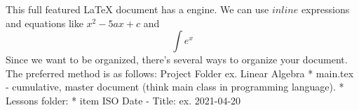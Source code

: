 \markdownRendererUlBegin
\markdownRendererUlItem This full featured LaTeX document has a  engine.\markdownRendererUlItemEnd 
\markdownRendererUlItem We can use $inline$ expressions and equations like $x^2-5ax+c$ and $$\int e^x$$\markdownRendererUlItemEnd 
\markdownRendererUlEnd \markdownRendererInterblockSeparator
{}\markdownRendererInterblockSeparator
{}Since we want to be organized, there's several ways to organize your document. The preferred method is as follows:\markdownRendererInterblockSeparator
{}\markdownRendererUlBeginTight
\markdownRendererUlItem Project Folder ex. Linear Algebra * main.tex - cumulative, master document (think main class in programming language). * Lessons folder: * item ISO Date - Title: ex. 2021-04-20\markdownRendererUlItemEnd 
\markdownRendererUlEndTight \relax